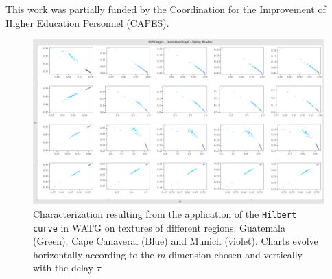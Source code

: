 \documentclass{isprs}
\begin{document}
	This work was partially funded by the Coordination for the Improvement of Higher Education Personnel (CAPES).
	
	\onecolumn
	\newpage
	\begin{figure}
		\centering
		\includegraphics[width=1.05\textwidth]{Figures/transitionGraphHilbert.pdf}
		\caption{Characterization resulting from the application of the \texttt{Hilbert curve} in WATG on textures of different regions: Guatemala (Green), Cape Canaveral (Blue) and Munich (violet). Charts evolve horizontally according to the $m$ dimension chosen and vertically with the delay $\tau$}
		\label{fig:Regions}
	\end{figure}
	
\end{document}
